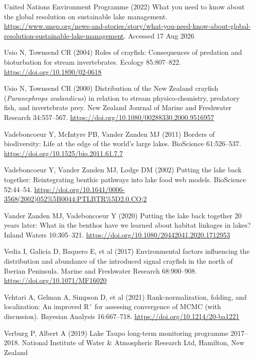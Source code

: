 \documentclass[
  12pt,
  a4paper,
  oneside]{scrbook}
\newlength{\cslhangindent}
\newenvironment{CSLReferences}[2] %
 {\begin{list}{}{%
  \setlength{\itemindent}{0pt}
  \setlength{\leftmargin}{0pt}
  \setlength{\parsep}{0pt}
  \ifodd #1
   \setlength{\leftmargin}{\cslhangindent}
   \setlength{\itemindent}{-1\cslhangindent}
  \fi
  \setlength{\itemsep}{#2\baselineskip}}}
 {\end{list}}
\renewenvironment{CSLReferences}[2]
   {\begin{list}{}{%
    \setlength{\itemindent}{0pt}
    \setlength{\leftmargin}{0pt}
    \setlength{\parsep}{0pt}
    \ifodd #1
     \setlength{\leftmargin}{\cslhangindent}
     \setlength{\itemindent}{-1\cslhangindent}
    \fi
    \setlength{\itemsep}{0.3\baselineskip}}}
   {\end{list}}%
\begin{document}
\begin{CSLReferences}{1}{1}
United Nations Environment Programme (2022) What you need to know about
the global resolution on sustainable lake management.
\url{https://www.unep.org/news-and-stories/story/what-you-need-know-about-global-resolution-sustainable-lake-management}.
Accessed 17 Aug 2026

Usio N, Townsend CR (2004) Roles of crayfish: Consequences of predation
and bioturbation for stream invertebrates. Ecology 85:807--822.
\url{https://doi.org/10.1890/02-0618}

Usio N, Townsend CR (2000) Distribution of the {New Zealand} crayfish
({\emph{Paranephrops zealandicus}}) in relation to stream
physico-chemistry, predatory fish, and invertebrate prey. New Zealand
Journal of Marine and Freshwater Research 34:557--567.
\url{https://doi.org/10.1080/00288330.2000.9516957}

Vadeboncoeur Y, McIntyre PB, Vander Zanden MJ (2011) Borders of
biodiversity: Life at the edge of the world's large lakes. BioScience
61:526--537. \url{https://doi.org/10.1525/bio.2011.61.7.7}

Vadeboncoeur Y, Vander Zanden MJ, Lodge DM (2002) Putting the lake back
together: Reintegrating benthic pathways into lake food web models.
BioScience 52:44--54.
\url{https://doi.org/10.1641/0006-3568(2002)052\%5B0044:PTLBTR\%5D2.0.CO;2}

Vander Zanden MJ, Vadeboncoeur Y (2020) Putting the lake back together
20 years later: What in the benthos have we learned about habitat
linkages in lakes? Inland Waters 10:305--321.
\url{https://doi.org/10.1080/20442041.2020.1712953}

Vedia I, Galicia D, Baquero E, et al (2017) Environmental factors
influencing the distribution and abundance of the introduced signal
crayfish in the north of {Iberian Peninsula}. Marine and Freshwater
Research 68:900--908. \url{https://doi.org/10.1071/MF16020}

Vehtari A, Gelman A, Simpson D, et al (2021) Rank-normalization,
folding, and localization: An improved {Rˆ} for assessing convergence of
{MCMC} (with discussion). Bayesian Analysis 16:667--718.
\url{https://doi.org/10.1214/20-ba1221}

Verburg P, Albert A (2019) {Lake Taupo} long-term monitoring programme
2017--2018. National Institute of Water \& Atmospheric Research Ltd,
Hamilton, New Zealand


\end{CSLReferences}
\end{document}
